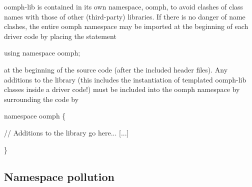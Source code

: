 \begin{DoxyItemize}
\item {\ttfamily oomph-\/lib} is contained in its own namespace, {\ttfamily oomph}, to avoid clashes of class names with those of other (third-\/party) libraries. If there is no danger of name clashes, the entire {\ttfamily oomph} namespace may be imported at the beginning of each driver code by placing the statement 
\begin{DoxyCode}
\textcolor{keyword}{using namespace }oomph;
\end{DoxyCode}
 at the beginning of the source code (after the included header files). Any additions to the library (this includes the instantiation of templated {\ttfamily oomph-\/lib} classes inside a driver code!) must be included into the {\ttfamily oomph} namespace by surrounding the code by 
\begin{DoxyCode}
\textcolor{keyword}{namespace }oomph
 \{

    \textcolor{comment}{// Additions to the library go here...}
    [...]
 
 \}
\end{DoxyCode}

\end{DoxyItemize}\hypertarget{index_std}{}\subsection{Namespace pollution}\label{index_std}

